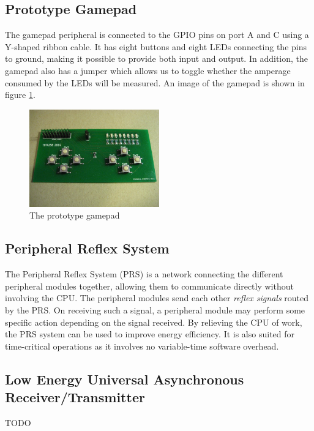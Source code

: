 \subsection{Prototype Gamepad}
The gamepad peripheral is connected to the GPIO pins on port A and C using a Y-shaped ribbon cable. It has eight buttons and eight LEDs connecting the pins to ground, making it possible to provide both input and output. In addition, the gamepad also has a jumper which allows us to toggle whether the amperage consumed by the LEDs will be measured. An image of the gamepad is shown in figure \ref{fig:gamepad}.

\begin{figure}[ht]
  \centering
  \includegraphics[width=0.5\textwidth]{images/gamepad.jpg}
  \caption{The prototype gamepad}\label{fig:gamepad}
\end{figure}




\subsection{Peripheral Reflex System}
The Peripheral Reflex System (PRS) is a network connecting the different peripheral modules together, allowing them to communicate directly without involving the CPU. The peripheral modules send each other \emph{reflex signals} routed by the PRS. On receiving such a signal, a peripheral module may perform some specific action depending on the signal received. By relieving the CPU of work, the PRS system can be used to improve energy efficiency. It is also suited for time-critical operations as it involves no variable-time software overhead.


\subsection{Low Energy Universal Asynchronous Receiver/Transmitter}\label{subsec:leuart}
TODO %



